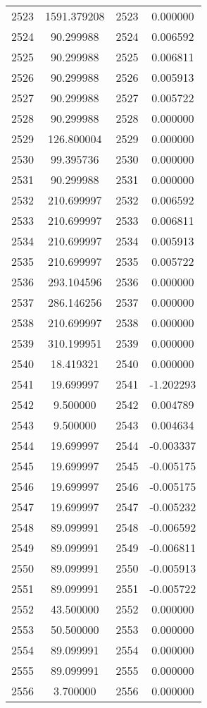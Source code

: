 \documentclass[12pt]{article}
\begin{document}
\begin{longtable}{@{}cccc@{}}
2523 & 1591.379208 & 2523 & 0.000000 \\
2524 & 90.299988 & 2524 & 0.006592 \\
2525 & 90.299988 & 2525 & 0.006811 \\
2526 & 90.299988 & 2526 & 0.005913 \\
2527 & 90.299988 & 2527 & 0.005722 \\
2528 & 90.299988 & 2528 & 0.000000 \\
2529 & 126.800004 & 2529 & 0.000000 \\
2530 & 99.395736 & 2530 & 0.000000 \\
2531 & 90.299988 & 2531 & 0.000000 \\
2532 & 210.699997 & 2532 & 0.006592 \\
2533 & 210.699997 & 2533 & 0.006811 \\
2534 & 210.699997 & 2534 & 0.005913 \\
2535 & 210.699997 & 2535 & 0.005722 \\
2536 & 293.104596 & 2536 & 0.000000 \\
2537 & 286.146256 & 2537 & 0.000000 \\
2538 & 210.699997 & 2538 & 0.000000 \\
2539 & 310.199951 & 2539 & 0.000000 \\
2540 & 18.419321 & 2540 & 0.000000 \\
2541 & 19.699997 & 2541 & -1.202293 \\
2542 & 9.500000 & 2542 & 0.004789 \\
2543 & 9.500000 & 2543 & 0.004634 \\
2544 & 19.699997 & 2544 & -0.003337 \\
2545 & 19.699997 & 2545 & -0.005175 \\
2546 & 19.699997 & 2546 & -0.005175 \\
2547 & 19.699997 & 2547 & -0.005232 \\
2548 & 89.099991 & 2548 & -0.006592 \\
2549 & 89.099991 & 2549 & -0.006811 \\
2550 & 89.099991 & 2550 & -0.005913 \\
2551 & 89.099991 & 2551 & -0.005722 \\
2552 & 43.500000 & 2552 & 0.000000 \\
2553 & 50.500000 & 2553 & 0.000000 \\
2554 & 89.099991 & 2554 & 0.000000 \\
2555 & 89.099991 & 2555 & 0.000000 \\
2556 & 3.700000 & 2556 & 0.000000 \\

\end{longtable}
\end{document}
